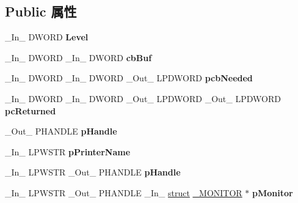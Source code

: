 \subsection*{Public 属性}
\begin{DoxyCompactItemize}
\item 
\mbox{\label{struct___m_o_n_i_t_o_r_a9a60b1ec1adb320a6e76339a0e1118a0}} 
\+\_\+\+In\+\_\+ D\+W\+O\+RD {\bfseries Level}
\item 
\mbox{\label{struct___m_o_n_i_t_o_r_ad21aae0c33060c7affd71fe8a54b8ad3}} 
\+\_\+\+In\+\_\+ D\+W\+O\+RD \+\_\+\+In\+\_\+ D\+W\+O\+RD {\bfseries cb\+Buf}
\item 
\mbox{\label{struct___m_o_n_i_t_o_r_a348043f747ec5bf817f7d7a67ced0e24}} 
\+\_\+\+In\+\_\+ D\+W\+O\+RD \+\_\+\+In\+\_\+ D\+W\+O\+RD \+\_\+\+Out\+\_\+ L\+P\+D\+W\+O\+RD {\bfseries pcb\+Needed}
\item 
\mbox{\label{struct___m_o_n_i_t_o_r_a69e6c580723d08663730d1f95a697d43}} 
\+\_\+\+In\+\_\+ D\+W\+O\+RD \+\_\+\+In\+\_\+ D\+W\+O\+RD \+\_\+\+Out\+\_\+ L\+P\+D\+W\+O\+RD \+\_\+\+Out\+\_\+ L\+P\+D\+W\+O\+RD {\bfseries pc\+Returned}
\item 
\mbox{\label{struct___m_o_n_i_t_o_r_a034187733145995b87b70c950c8fde6d}} 
\+\_\+\+Out\+\_\+ P\+H\+A\+N\+D\+LE {\bfseries p\+Handle}
\item 
\mbox{\label{struct___m_o_n_i_t_o_r_ab428430f450b940ad704836d72116e82}} 
\+\_\+\+In\+\_\+ L\+P\+W\+S\+TR {\bfseries p\+Printer\+Name}
\item 
\mbox{\label{struct___m_o_n_i_t_o_r_a46e792ad2d684de407bfa51b4d9f0fe0}} 
\+\_\+\+In\+\_\+ L\+P\+W\+S\+TR \+\_\+\+Out\+\_\+ P\+H\+A\+N\+D\+LE {\bfseries p\+Handle}
\item 
\mbox{\label{struct___m_o_n_i_t_o_r_ab5ab80585034fd7bc85e649c61ceebd7}} 
\+\_\+\+In\+\_\+ L\+P\+W\+S\+TR \+\_\+\+Out\+\_\+ P\+H\+A\+N\+D\+LE \+\_\+\+In\+\_\+ \hyperlink{interfacestruct}{struct} \hyperlink{struct___m_o_n_i_t_o_r}{\+\_\+\+M\+O\+N\+I\+T\+OR} $\ast$ {\bfseries p\+Monitor}
\item 

\end{DoxyCompactItemize}
